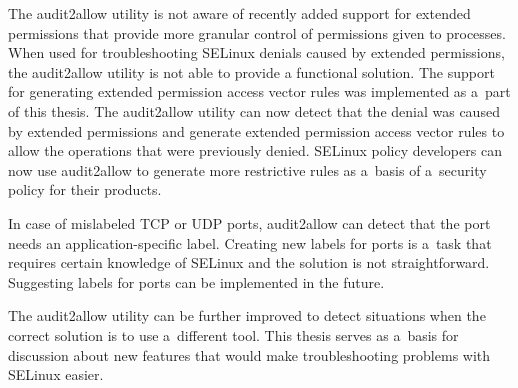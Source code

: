 The audit2allow utility is not aware of recently added support for extended
permissions that provide more granular control of permissions given to
processes. When used for troubleshooting SELinux denials caused by extended
permissions, the audit2allow utility is not able to provide a functional
solution.  The support for generating extended permission access vector rules
was implemented as a~part of this thesis. The audit2allow utility can now detect
that the denial was caused by extended permissions and generate extended
permission access vector rules to allow the operations that were previously
denied. SELinux policy developers can now use audit2allow to generate more
restrictive rules as a~basis of a~security policy for their products.

In case of mislabeled TCP or UDP ports, audit2allow can detect that the port
needs an application-specific label. Creating new labels for ports is a~task
that requires certain knowledge of SELinux and the solution is not
straightforward. Suggesting labels for ports can be implemented in the future.


The audit2allow utility can be further improved to detect situations when the
correct solution is to use a~different tool. This thesis serves as a~basis for
discussion about new features that would make troubleshooting problems with
SELinux easier.
